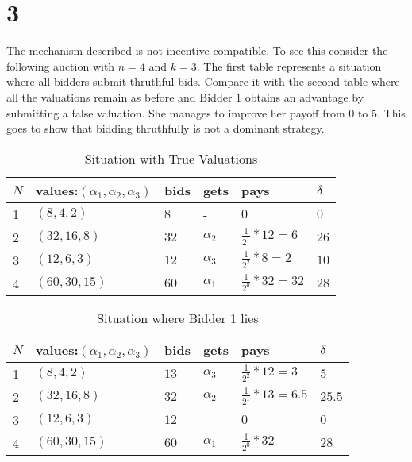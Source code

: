 \documentclass[10pt,a4paper]{article}
\begin{document}
\section*{3}
The mechanism described is not incentive-compatible. To see this consider the following auction with $n=4$ and $k=3$. The first table represents a situation where all bidders submit thruthful bids. Compare it with the second table where all the valuations remain as before and Bidder $1$ obtains an advantage by submitting a false valuation. She manages to improve her payoff from $0$ to $5$. This goes to show that bidding thruthfully is not a dominant strategy.
\begin{table}[h]
\centering
\caption{Situation with True Valuations}
\label{my-label}
\begin{tabular}{|l|l|l|l|l|l|}
\hline
$N$ & values:$(\alpha_1,\alpha_2,\alpha_3)$ & bids & gets       & pays                & $\delta$ \\ \hline
1 & $(8,4,2)$                                & $8$    & -          & $0$                   & $0$        \\ \hline
2 & $(32,16,8)$                              & $32$   & $\alpha_2$ & $\tfrac{1}{2^1}*12=6$ & $26$       \\ \hline
3 & $(12,6,3)$                               & $12$   & $\alpha_3$ & $\tfrac{1}{2^2}*8=2$  & $10$       \\ \hline
4 & $(60,30,15)$                             & $60$   & $\alpha_1$ & $\tfrac{1}{2^0}*32=32$ & $28$       \\ \hline
\end{tabular}
\end{table}
\begin{table}[h]
\centering
\caption{Situation where Bidder 1 lies}
\label{my-label}
\begin{tabular}{|l|l|l|l|l|l|}
\hline
$N$ & values:$(\alpha_1,\alpha_2,\alpha_3)$ & bids & gets       & pays                & $\delta$ \\ \hline
1 & $(8,4,2)$                                & $13$    & $\alpha_3$& $\tfrac{1}{2^2}*12=3$  & $5$     \\ \hline
2 & $(32,16,8)$                              & $32$   & $\alpha_2$ & $\tfrac{1}{2^1}*13=6.5$ & $25.5$       \\ \hline
3 & $(12,6,3)$                               & $12$   & -			 & $0$  					& $0$       \\ \hline
4 & $(60,30,15)$                             & $60$   & $\alpha_1$ & $\tfrac{1}{2^0}*32$ & $28$       \\ \hline
\end{tabular}
\end{table}
\end{document}
